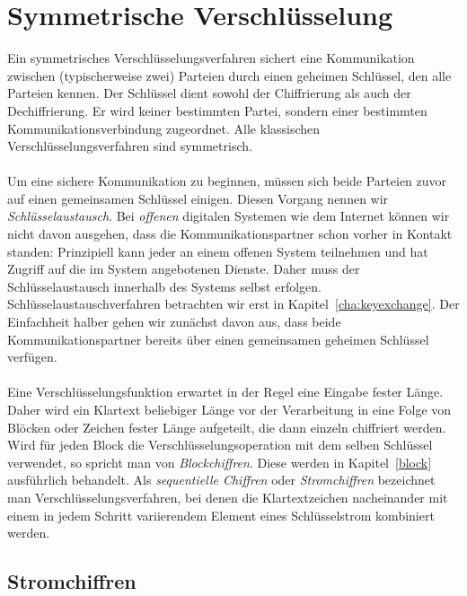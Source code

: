 \chapter{Symmetrische Verschlüsselung}
\label{cha:symencryption}

Ein symmetrisches Verschlüsselungsverfahren sichert eine Kommunikation zwischen (typischerweise zwei) Parteien durch einen geheimen Schlüssel, den alle Parteien kennen. Der Schlüssel dient sowohl der Chiffrierung als auch der Dechiffrierung. Er wird keiner bestimmten Partei, sondern einer bestimmten Kommunikationsverbindung zugeordnet. Alle klassischen Verschlüsselungsverfahren sind symmetrisch.\\ \ \\
Um eine sichere Kommunikation zu beginnen, müssen sich beide Parteien zuvor auf einen gemeinsamen Schlüssel einigen. Diesen Vorgang nennen wir \emph{Schlüsselaustausch}. Bei \emph{offenen} digitalen Systemen wie dem Internet können wir nicht davon ausgehen, dass die Kommunikationspartner schon vorher in Kontakt standen: Prinzipiell kann jeder an einem offenen System teilnehmen und hat Zugriff auf die im System angebotenen Dienste. Daher muss der
Schlüsselaustausch innerhalb des Systems selbst erfolgen. Schlüsselaustauschverfahren betrachten wir erst  in Kapitel~\ref{cha:keyexchange}. Der Einfachheit halber gehen wir zunächst davon aus, dass beide Kommunikationspartner bereits über einen gemeinsamen geheimen Schlüssel verfügen.\\ \ \\
Eine Verschlüsselungsfunktion erwartet in der Regel eine Eingabe fester Länge. Daher wird ein Klartext beliebiger Länge vor der Verarbeitung in eine Folge von Blöcken oder Zeichen fester Länge aufgeteilt, die dann einzeln chiffriert werden. Wird für jeden Block die Verschlüsselungsoperation mit dem selben Schlüssel verwendet, so spricht man von \emph{Blockchiffren}. Diese werden in Kapitel~\ref{block} ausführlich behandelt. Als \emph{sequentielle Chiffren} oder \emph{Stromchiffren} bezeichnet man Verschlüsselungsverfahren, bei denen die Klartextzeichen nacheinander mit einem in jedem Schritt variierendem Element eines Schlüsselstrom kombiniert werden.

\section{Stromchiffren}

